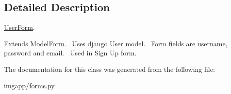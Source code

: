 \subsection{Detailed Description}
\hyperlink{classimgapp_1_1forms_1_1UserForm}{User\+Form}. 

Extends Model\+Form.~\newline
 Uses django User model.~\newline
 Form fields are username, password and email.~\newline
 Used in Sign Up form. 

The documentation for this class was generated from the following file\+:\begin{DoxyCompactItemize}
\item 
imgapp/\hyperlink{forms_8py}{forms.\+py}\end{DoxyCompactItemize}
